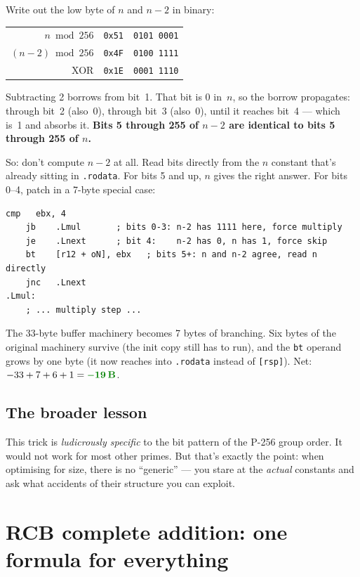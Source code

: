 \documentclass[11pt,a4paper]{article}
\newcommand{\saved}[1]{\textcolor{green!50!black}{\textbf{$-$#1\,B}}}
\begin{document}
Write out the low byte of $n$ and $n-2$ in binary:
\begin{center}
\begin{tabular}{r@{\;=\;}l@{\;=\;}l}
$n \bmod 256$   & \texttt{0x51} & \texttt{0101\,0001} \\
$(n-2) \bmod 256$ & \texttt{0x4F} & \texttt{0100\,1111} \\
XOR               & \texttt{0x1E} & \texttt{0001\,1110} \\
\end{tabular}
\end{center}
Subtracting 2 borrows from bit~1. That bit is 0 in~$n$, so the borrow
propagates: through bit~2 (also~0), through bit~3 (also~0), until it
reaches bit~4 --- which is~1 and absorbs it. \textbf{Bits 5 through
255 of $n-2$ are identical to bits 5 through 255 of $n$.}

So: don't compute $n-2$ at all. Read bits directly from the $n$
constant that's already sitting in \texttt{.rodata}. For bits 5 and
up, $n$ gives the right answer. For bits 0--4, patch in a 7-byte
special case:
\begin{lstlisting}[language={[x86masm]Assembler}]
    cmp   ebx, 4
    jb    .Lmul       ; bits 0-3: n-2 has 1111 here, force multiply
    je    .Lnext      ; bit 4:    n-2 has 0, n has 1, force skip
    bt    [r12 + oN], ebx   ; bits 5+: n and n-2 agree, read n directly
    jnc   .Lnext
.Lmul:
    ; ... multiply step ...
\end{lstlisting}

The 33-byte buffer machinery becomes 7 bytes of branching. Six bytes
of the original machinery survive (the init copy still has to run),
and the \texttt{bt} operand grows by one byte (it now reaches into
\texttt{.rodata} instead of \texttt{[rsp]}). Net: $-33 + 7 + 6 + 1 =
\saved{19}$.

\subsection{The broader lesson}

This trick is \emph{ludicrously specific} to the bit pattern of the
P-256 group order. It would not work for most other primes. But
that's exactly the point: when optimising for size, there is no
``generic'' --- you stare at the \emph{actual} constants and ask what
accidents of their structure you can exploit.

\section{RCB complete addition: one formula for everything}
\label{sec:rcb}
\end{document}
